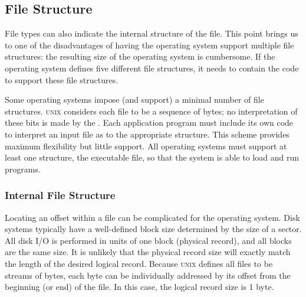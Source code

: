 \subsection{File Structure}\label{subsec:File_Structure}
File types can also indicate the internal structure of the file.
This point brings us to one of the disadvantages of having the operating system support multiple file structures: the resulting size of the operating system is cumbersome.
If the operating system defines five different file structures, it needs to contain the code to support these file structures.

Some operating systems impose (and support) a minimal number of file structures.
\textsc{unix} considers each file to be a sequence of bytes; no interpretation of these bits is made by the \textbf{}.
Each application program must include its own code to interpret an input file as to the appropriate structure.
This scheme provides maximum flexibility but little support.
All operating systems must support at least one structure, the executable file, so that the system is able to load and run programs.

\subsubsection{Internal File Structure}\label{subsubsec:Internal_File_Structure}
Locating an offset within a file can be complicated for the operating system.
Disk systems typically have a well-defined block size determined by the size of a sector.
All disk I/O is performed in units of one block (physical record), and all blocks are the same size.
It is unlikely that the physical record size will exactly match the length of the desired logical record.
Because \textsc{unix} defines all files to be streams of bytes, each byte can be individually addressed by its offset from the beginning (or end) of the file.
In this case, the logical record size is 1 byte.

